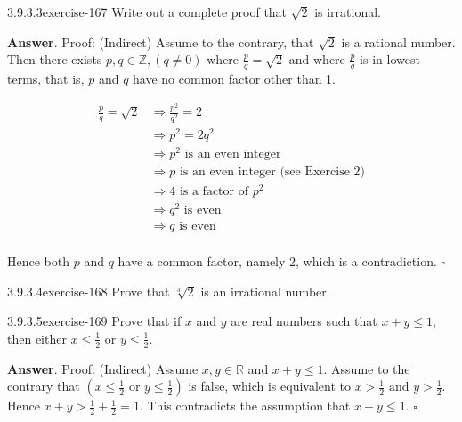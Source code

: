 \documentclass[twoside,10pt,]{book}
\numberwithin{equation}{section}
\begin{document}
\begin{divisionsolution}{3.9.3.3}{}{exercise-167}%
\hypertarget{p-1496}{}%
Write out a complete proof that \(\sqrt{2}\) is irrational.%
\par\smallskip%
\noindent\textbf{Answer}.\quad%
\hypertarget{p-1497}{}%
Proof: (Indirect) Assume to the contrary, that \(\sqrt{2}\) is a rational number. Then there exists \(p,q\in \mathbb{Z}, (q\neq 0)\) where \(\frac{p}{q}=\sqrt{2}\) and where \(\frac{p}{q}\) is in lowest terms, that is, \(p\) and \(q\) have no common factor other than 1.%
\par
\hypertarget{p-1498}{}%
%
\begin{equation*}
\begin{split}
\frac{p}{q}=\sqrt{2} & \Rightarrow \frac{p^2}{q^2}=2\\
&\Rightarrow p^2=2 q^2 \\
&\Rightarrow p^2 \textrm{ is an even integer}\\
&\Rightarrow p  \textrm{ is an even integer (see Exercise 2)}\\
&\Rightarrow \textrm{4 is a factor of }p^2\\
&\Rightarrow q^2 \textrm{ is even}\\
&\Rightarrow q \textrm{ is even}\\
\end{split}
\end{equation*}
%
\par
\hypertarget{p-1499}{}%
Hence both \(p\) and \(q\) have a common factor, namely 2, which is a contradiction. \(\square\)%
\end{divisionsolution}%
\begin{divisionsolution}{3.9.3.4}{}{exercise-168}%
\hypertarget{p-1500}{}%
Prove that \(\sqrt[3]{2}\) is an irrational number.%
\end{divisionsolution}%
\begin{divisionsolution}{3.9.3.5}{}{exercise-169}%
\hypertarget{p-1501}{}%
Prove that if \(x\) and \(y\) are real numbers such that \(x + y \leq  1\), then either  \(x\leq \frac{1}{2}\) or \(y\leq  \frac{1}{2}\).%
\par\smallskip%
\noindent\textbf{Answer}.\quad%
\hypertarget{p-1502}{}%
Proof: (Indirect) Assume \(x,y\in \mathbb{R}\) and \(x+y\leqslant 1\). Assume to the contrary that \(\left(x\leqslant \frac{1}{2}\textrm{ or } y\leqslant \frac{1}{2}\right)\) is false, which is equivalent to \(x>\frac{1}{2}\textrm{ and } y>\frac{1}{2}\). Hence \(x+y>\frac{1}{2}+\frac{1}{2}=1\). This contradicts the assumption that \(x+y\leqslant 1\). \(\square\)%
\end{divisionsolution}%
\end{document}
